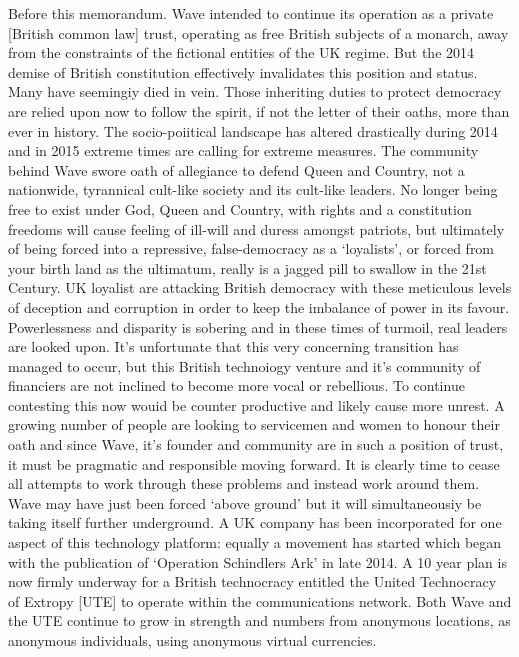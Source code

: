 \documentclass[letterpaper,10pt,openany,oneside,english]{sphinxmanual}
\begin{document}
Before this memorandum. Wave intended to continue its operation as a private {[}British common law{]} trust, operating as free British subjects of a monarch, away from the constraints of the fictional entities of the UK regime. But the 2014 demise of British constitution effectively invalidates this position and status. Many have seemingiy died in vein. Those inheriting duties to protect democracy are relied upon now to follow the spirit, if not the letter of their oaths, more than ever in history. The socio-poiitical landscape has altered drastically during 2014 and in 2015 extreme times are calling for extreme measures. The community behind Wave swore oath of allegiance to defend Queen and Country, not a nationwide, tyrannical cult-like society and its cult-like leaders. No longer being free to exist under God, Queen and Country, with rights and a constitution freedoms will cause feeling of ill-will and duress amongst patriots, but ultimately of being forced into a repressive, false-democracy as a ‘loyalists’, or forced from your birth land as the ultimatum, really is a jagged pill to swallow in the 21st Century. UK loyalist are attacking British democracy with these meticulous levels of deception and corruption in order to keep the imbalance of power in its favour. Powerlessness and disparity is sobering and in these times of turmoil, real leaders are looked upon. It’s unfortunate that this very concerning transition has managed to occur, but this British technoiogy venture and it’s community of financiers are not inclined to become more vocal or rebellious. To continue contesting this now wouid be counter productive and likely cause more unrest. A growing number of people are looking to servicemen and women to honour their oath and since Wave, it’s founder and community are in such a position of trust, it must be pragmatic and responsible moving forward. It is clearly time to cease all attempts to work through these problems and instead work around them. Wave may have just been forced ‘above ground’ but it will simultaneousiy be taking itself further underground. A UK company has been incorporated for one aspect of this technology platform: equally a movement has started which began with the publication of ‘Operation Schindlers Ark’ in late 2014. A 10 year plan is now firmly underway for a British technocracy entitled the United Technocracy of Extropy {[}UTE{]} to operate within the communications network. Both Wave and the UTE continue to grow in strength and numbers from anonymous locations, as anonymous individuals, using anonymous virtual currencies.
\end{document}
